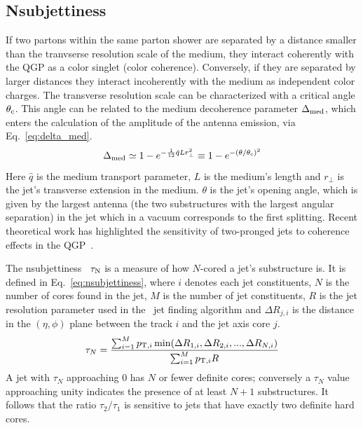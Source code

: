 \documentclass[10pt]{article}
\begin{document}
\subsection{Nsubjettiness}
\label{sect:nsubjettiness}
If two partons within the same parton shower are separated by a distance smaller than the tranvserse resolution scale of the medium, they interact coherently with the QGP as a color singlet (color coherence). 
Conversely, if they are separated by larger distances they interact incoherently with the medium as independent color charges.
The transverse resolution scale can be characterized with a critical angle $\theta_{\rm c}$. This angle can be related to the medium decoherence parameter $\Delta_{\rm med}$, which enters the calculation of the amplitude of the antenna emission, via Eq.~\ref{eq:delta_med}\cite{Mehtar-Tani:2012, Casalderrey-Solana:2013}.
\begin{equation}
\Delta_{\rm med} \simeq 1 - e^{-\frac{1}{12}\hat{q}Lr^2_{\bot}} \equiv 1 - e^{-(\theta/\theta_{\rm c})^2}
\label{eq:delta_med}
\end{equation}
Here $\hat{q}$ is the medium transport parameter, $L$ is the medium's
length and $r_{\bot}$ is the jet's transverse extension in the medium. $\theta$ is the jet's opening angle, which is given by
the largest antenna (the two substructures with the largest angular separation) in the jet which in a vacuum
corresponds to the first splitting. Recent theoretical work has highlighted the sensitivity of two-pronged jets
to coherence effects in the QGP~\cite{}.

The nsubjettiness~\cite{} $\tau_{\rm N}$ is a measure of how $N$-cored a jet's substructure is. It is defined in Eq.~\ref{eq:nsubjettiness}, where
$i$ denotes each jet constituents, $N$ is the number of cores found in the jet, $M$ is the number of jet constituents, $R$ is the jet resolution parameter used in the \kt\ jet finding algorithm
and $\Delta R_{j,i}$ is the distance in the $(\eta,\phi)$ plane between the track $i$ and the jet axis core $j$.
\begin{equation}
\tau_N = \frac{\sum^M_{i=1}p_{{\rm T},i}\min(\Delta R_{1,i},\Delta R_{2,i},...,\Delta R_{N,i})}{\sum^M_{i=1}p_{{\rm T},i}R}
\label{eq:nsubjettiness}
\end{equation}
A jet with $\tau_N$ approaching $0$ 
has $N$ or fewer definite cores; conversely a $\tau_N$ value
approaching unity indicates the presence of at least $N + 1$ substructures. 
It follows that the ratio $\tau_2/\tau_1$ is sensitive to jets that have exactly two definite hard cores. 
\end{document}
